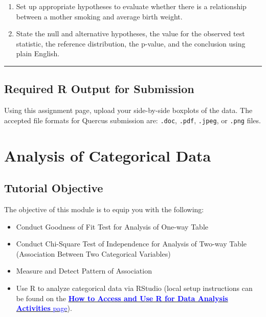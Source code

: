 \documentclass[oneside,openany]{book}
\providecommand{\tightlist}{%
  \setlength{\itemsep}{0pt}\setlength{\parskip}{0pt}}
\begin{document}
\begin{enumerate}
\def\labelenumi{\arabic{enumi}.}
\tightlist
\item
  Set up appropriate hypotheses to evaluate whether there is a relationship between a mother smoking and average birth weight.
\item
  State the null and alternative hypotheses, the value for the observed test statistic, the reference distribution, the p-value, and the conclusion using plain English.
\end{enumerate}

\begin{center}\rule{0.5\linewidth}{0.5pt}\end{center}

\section{Required R Output for Submission}\label{required-r-output-for-submission-4}

Using this assignment page, upload your side-by-side boxplots of the data. The accepted file formats for Quercus submission are: \texttt{.doc}, \texttt{.pdf}, \texttt{.jpeg}, or \texttt{.png} files.

\chapter{Analysis of Categorical Data}\label{activity-9---analysis-of-categorical-data}

\section{Tutorial Objective}\label{tutorial-objective-6}

The objective of this module is to equip you with the following:

\begin{itemize}
\tightlist
\item
  Conduct Goodness of Fit Test for Analysis of One-way Table
\item
  Conduct Chi-Square Test of Independence for Analysis of Two-way Table (Association Between Two Categorical Variables)
\item
  Measure and Detect Pattern of Association
\item
  Use R to analyze categorical data via RStudio (local setup instructions can be found on the \hyperref[how-to-set-up-r-for-data-analysis-activities]{\textcolor{blue}{\textbf{How to Access and Use R for Data Analysis Activities} page}}).
\end{itemize}
\end{document}
